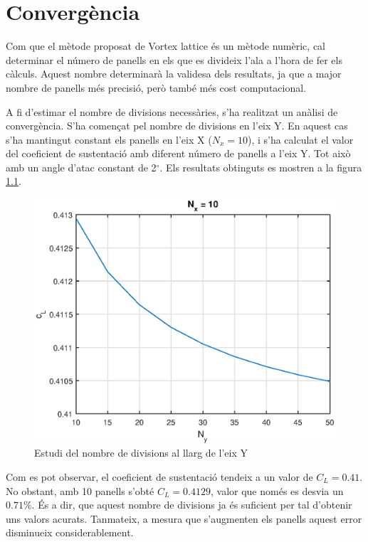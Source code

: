 \chapter{Convergència}
Com que el mètode proposat de Vortex lattice és un mètode numèric, cal determinar el número de panells en els que es divideix l'ala a l'hora de fer els càlculs. Aquest nombre determinarà la validesa dels resultats, ja que a major nombre de panells més precisió, però també més cost computacional.

A fi d'estimar el nombre de divisions necessàries, s'ha realitzat un anàlisi de convergència. S'ha començat pel nombre de divisions en l'eix Y. En aquest cas s'ha mantingut constant els panells en l'eix X ($N_{x}=10$), i s'ha calculat el valor del coeficient de sustentació amb diferent número de panells a l'eix Y. Tot això amb un angle d'atac constant de 2$^{\circ}$. Els resultats obtinguts es mostren a la figura \ref{ny}.

\begin{figure}[H]
	\centering
	\includegraphics[scale=0.95]{./plots/nycl}
	\caption{Estudi del nombre de divisions al llarg de l'eix Y}
	\label{ny}
\end{figure}

Com es pot observar, el coeficient de sustentació tendeix a un valor de $C_{L}=0.41$. No obstant, amb 10 panells s'obté $C_{L}=0.4129$, valor que només es desvia un $0.71\%$. És a dir, que aquest nombre de divisions ja és suficient per tal d'obtenir uns valors acurats. Tanmateix, a mesura que s'augmenten els panells aquest error disminueix considerablement.

